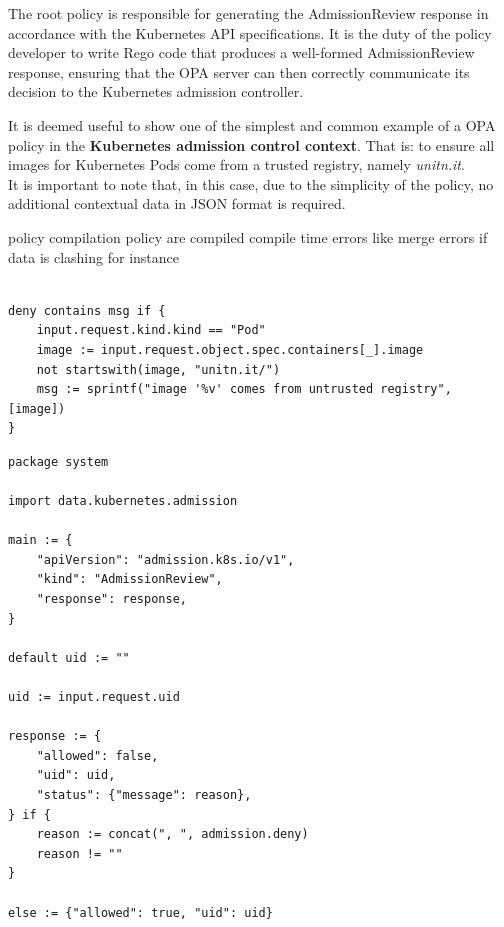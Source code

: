 The root policy is responsible for generating the AdmissionReview response in accordance with the Kubernetes API specifications. It is the duty of the policy developer to write Rego code that produces a well-formed AdmissionReview response, ensuring that the OPA server can then correctly communicate its decision to the Kubernetes admission controller.



It is deemed useful to show one of the simplest and common example of a OPA policy in the \textbf{Kubernetes admission control context}. That is: to ensure all images for Kubernetes Pods come from a trusted registry, namely \textit{unitn.it}. \\


It is important to note that, in this case, due to the simplicity of the policy, no additional contextual data in JSON format is required.


policy compilation
policy are compiled
compile time errors like merge errors if data is clashing for instance

\begin{lstlisting}[language=Rego, caption={Rego policy for Pods registry},
label=lst:rego_data_mapping]
                                          
deny contains msg if {                                                      
    input.request.kind.kind == "Pod"                                        
    image := input.request.object.spec.containers[_].image                  
    not startswith(image, "unitn.it/")                                     
    msg := sprintf("image '%v' comes from untrusted registry", [image])     
}
\end{lstlisting}

\begin{lstlisting}[caption={Rego ``root" policy (system.main)}]
package system

import data.kubernetes.admission

main := {
	"apiVersion": "admission.k8s.io/v1",
	"kind": "AdmissionReview",
	"response": response,
}

default uid := ""

uid := input.request.uid

response := {
	"allowed": false,
	"uid": uid,
	"status": {"message": reason},
} if {
	reason := concat(", ", admission.deny)
	reason != ""
}

else := {"allowed": true, "uid": uid}
\end{lstlisting}



